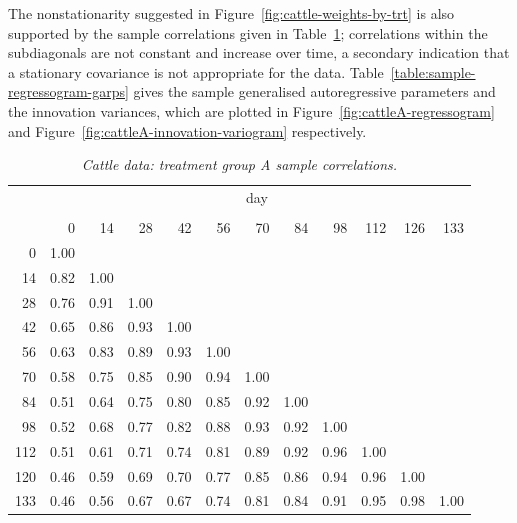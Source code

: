 \bigskip

The nonstationarity suggested in Figure~\ref{fig:cattle-weights-by-trt} is also supported by the sample correlations given in Table~\ref{table:cattleA-sample-correlations}; correlations within the subdiagonals are not constant and increase over time, a secondary indication that a stationary covariance is not appropriate for the data.  Table~\ref{table:sample-regressogram-garps} gives the sample generalised autoregressive parameters and the innovation variances, which are plotted in Figure~\ref{fig:cattleA-regressogram} and Figure~\ref{fig:cattleA-innovation-variogram} respectively. 

\begin{table}[H] 
\begin{center}
\begin{tabular}{r|rrrrrrrrrrr}
& \multicolumn{11}{c}{day}\\
&&&&&&&&&&\\
& 0 & 14 & 28 & 42 & 56 & 70 & 84 & 98& 112& 126 &133\\
  \hline\noalign{\smallskip} 
0 & 1.00  \\ 
  14 & 0.82 & 1.00  \\ 
  28 & 0.76 & 0.91 & 1.00 & \\ 
  42 & 0.65 & 0.86 & 0.93 & 1.00 &  \\ 
  56 & 0.63 & 0.83 & 0.89 & 0.93 & 1.00 &  \\ 
  70 & 0.58 & 0.75 & 0.85 & 0.90 & 0.94 & 1.00 & \\ 
  84 & 0.51 & 0.64 & 0.75 & 0.80 & 0.85 & 0.92 & 1.00 &\\ 
  98 & 0.52 & 0.68 & 0.77 & 0.82 & 0.88 & 0.93 & 0.92 & 1.00 & \\ 
  112 & 0.51 & 0.61 & 0.71 & 0.74 & 0.81 & 0.89 & 0.92 & 0.96 & 1.00 & \\ 
  120 & 0.46 & 0.59 & 0.69 & 0.70 & 0.77 & 0.85 & 0.86 & 0.94 & 0.96 & 1.00 &  \\ 
  133 & 0.46 & 0.56 & 0.67 & 0.67 & 0.74 & 0.81 & 0.84 & 0.91 & 0.95 & 0.98 & 1.00 \\ 
   \hline
\end{tabular}
\caption{\textit{Cattle data: treatment group A sample correlations.}}\label{table:cattleA-sample-correlations}
\end{center}
\end{table}



